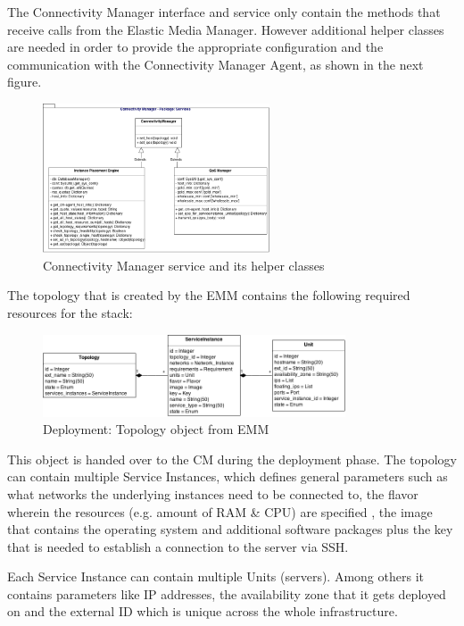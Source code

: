 The Connectivity Manager interface and service only contain the methods that receive calls from the Elastic Media Manager. However additional helper classes are needed in order to provide the appropriate configuration and the communication with the Connectivity Manager Agent, as shown in the next figure.

\begin{figure}[H]
\centering

\includegraphics[width=0.6\textwidth]{images/design/cm_class_diagram}

\caption{Connectivity Manager service and its helper classes}
\end{figure}

The topology that is created by the EMM contains the following required resources for the stack:

\begin{figure}[H]
\centering

\includegraphics[width=0.8\textwidth]{images/design/cm_topology_object}

\caption{Deployment: Topology object from EMM}
\end{figure}

This object is handed over to the CM during the deployment phase. The topology can contain multiple Service Instances, which defines general parameters such as what networks the underlying instances need to be connected to, the flavor wherein the resources (e.g. amount of RAM \& CPU) are specified \cite{openstack-admin}, the image that contains the operating system and additional software packages plus the key that is needed to establish a connection to the server via SSH.

Each Service Instance can contain multiple Units (servers). Among others it contains parameters like IP addresses, the availability zone that it gets deployed on and the external ID which is unique across the whole infrastructure.



